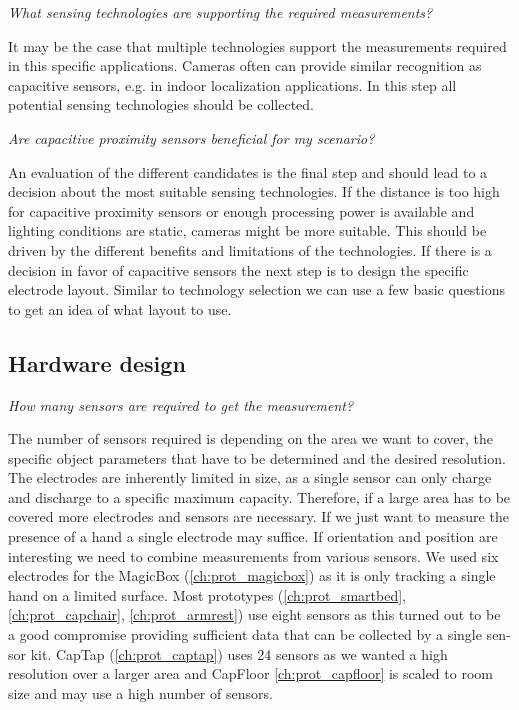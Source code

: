 \textit{What sensing technologies are supporting the required measurements?}

It may be the case that multiple technologies support the measurements required in this specific applications. Cameras often can provide similar recognition as capacitive sensors, e.g. in indoor localization applications. In this step all potential sensing technologies should be collected.

\textit{Are capacitive proximity sensors beneficial for my scenario?}

An evaluation of the different candidates is the final step and should lead to a decision about the most suitable sensing technologies. If the distance is too high for capacitive proximity sensors or enough processing power is available and lighting conditions are static, cameras might be more suitable. This should be driven by the different benefits and limitations of  the technologies.
If there is a decision in favor of capacitive sensors the next step is to design the specific electrode layout. Similar to technology selection we can use a few basic questions to get an idea of what layout to use.

\subsection{Hardware design}
\textit{How many sensors are required to get the measurement?}

The number of sensors required is depending on the area we want to cover, the specific object parameters that have to be determined and the desired resolution. The electrodes are inherently limited in size, as a single sensor can only charge and discharge to a specific maximum capacity. Therefore, if a large area has to be covered more electrodes and sensors are necessary. If we just want to measure the presence of a hand a single electrode may suffice. If orientation and position are interesting we need to combine measurements from various sensors. We used six electrodes for the MagicBox (\ref{ch:prot_magicbox}) as it is only tracking a single hand on a limited surface. Most prototypes (\ref{ch:prot_smartbed}, \ref{ch:prot_capchair}, \ref{ch:prot_armrest}) use eight sensors as this turned out to be a good compromise providing sufficient data that can be collected by a single sen-sor kit. CapTap (\ref{ch:prot_captap}) uses 24 sensors as we wanted a high resolution over a larger area and CapFloor \ref{ch:prot_capfloor} is scaled to room size and may use a high number of sensors.


